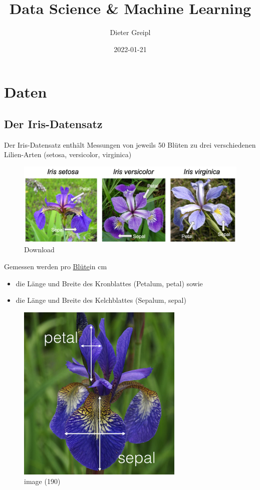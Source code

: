 \documentclass[
  oneside]{book}
\title{Data Science \& Machine Learning}
\author{Dieter Greipl}
\date{2022-01-21}
\providecommand{\tightlist}{%
  \setlength{\itemsep}{0pt}\setlength{\parskip}{0pt}}
\theoremstyle{definition}
\theoremstyle{definition}
\theoremstyle{definition}
\theoremstyle{definition}
\theoremstyle{remark}
\begin{document}
\maketitle

{
\setcounter{tocdepth}{1}
\tableofcontents
}
\hypertarget{daten}{%
\chapter{Daten}\label{daten}}

\hypertarget{der-iris-datensatz}{%
\section{Der Iris-Datensatz}\label{der-iris-datensatz}}

Der Iris-Datensatz enthält Messungen von jeweils 50 Blüten zu drei verschiedenen Lilien-Arten (setosa, versicolor, virginica)

\begin{figure}
\centering
\includegraphics{assets/daten.assets/Download.png}
\caption{Download}
\end{figure}

Gemessen werden pro \href{https://de.wikipedia.org/wiki/Bl\%C3\%BCte}{Blüte}in cm 

\begin{itemize}
\tightlist
\item
  die Länge und Breite des Kronblattes (Petalum, petal) sowie 
\item
  die Länge und Breite des Kelchblattes (Sepalum, sepal)
\end{itemize}

\begin{figure}
\centering
\includegraphics{assets/daten.assets/image_messung-16426070933692.png}
\caption{image (190)}
\end{figure}
\end{document}
